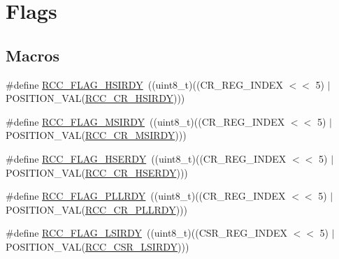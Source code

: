 \hypertarget{group___r_c_c___flag}{\section{Flags}
\label{group___r_c_c___flag}
}
\subsection*{Macros}
\begin{DoxyCompactItemize}
\item 
\#define \hyperlink{group___r_c_c___flag_ga827d986723e7ce652fa733bb8184d216}{R\-C\-C\-\_\-\-F\-L\-A\-G\-\_\-\-H\-S\-I\-R\-D\-Y}~((uint8\-\_\-t)((C\-R\-\_\-\-R\-E\-G\-\_\-\-I\-N\-D\-E\-X $<$$<$ 5) $\vert$ P\-O\-S\-I\-T\-I\-O\-N\-\_\-\-V\-A\-L(\hyperlink{group___peripheral___registers___bits___definition_ga9dbac3f2bc04f04ebafe1e66ae3fcf0d}{R\-C\-C\-\_\-\-C\-R\-\_\-\-H\-S\-I\-R\-D\-Y})))
\item 
\#define \hyperlink{group___r_c_c___flag_ga62ed7a3bb53fc28801071a2ad0d4f1af}{R\-C\-C\-\_\-\-F\-L\-A\-G\-\_\-\-M\-S\-I\-R\-D\-Y}~((uint8\-\_\-t)((C\-R\-\_\-\-R\-E\-G\-\_\-\-I\-N\-D\-E\-X $<$$<$ 5) $\vert$ P\-O\-S\-I\-T\-I\-O\-N\-\_\-\-V\-A\-L(\hyperlink{group___peripheral___registers___bits___definition_gac38ef564d136d79b5e22b564db8d2b07}{R\-C\-C\-\_\-\-C\-R\-\_\-\-M\-S\-I\-R\-D\-Y})))
\item 
\#define \hyperlink{group___r_c_c___flag_ga173edf47bec93cf269a0e8d0fec9997c}{R\-C\-C\-\_\-\-F\-L\-A\-G\-\_\-\-H\-S\-E\-R\-D\-Y}~((uint8\-\_\-t)((C\-R\-\_\-\-R\-E\-G\-\_\-\-I\-N\-D\-E\-X $<$$<$ 5) $\vert$ P\-O\-S\-I\-T\-I\-O\-N\-\_\-\-V\-A\-L(\hyperlink{group___peripheral___registers___bits___definition_ga86a34e00182c83409d89ff566cb02cc4}{R\-C\-C\-\_\-\-C\-R\-\_\-\-H\-S\-E\-R\-D\-Y})))
\item 
\#define \hyperlink{group___r_c_c___flag_gaf82d8afb18d9df75db1d6c08b9c50046}{R\-C\-C\-\_\-\-F\-L\-A\-G\-\_\-\-P\-L\-L\-R\-D\-Y}~((uint8\-\_\-t)((C\-R\-\_\-\-R\-E\-G\-\_\-\-I\-N\-D\-E\-X $<$$<$ 5) $\vert$ P\-O\-S\-I\-T\-I\-O\-N\-\_\-\-V\-A\-L(\hyperlink{group___peripheral___registers___bits___definition_gafa12d7ac6a7f0f91d066aeb2c6071888}{R\-C\-C\-\_\-\-C\-R\-\_\-\-P\-L\-L\-R\-D\-Y})))
\item 
\#define \hyperlink{group___r_c_c___flag_ga8c5e4992314d347597621bfe7ab10d72}{R\-C\-C\-\_\-\-F\-L\-A\-G\-\_\-\-L\-S\-I\-R\-D\-Y}~((uint8\-\_\-t)((C\-S\-R\-\_\-\-R\-E\-G\-\_\-\-I\-N\-D\-E\-X $<$$<$ 5) $\vert$ P\-O\-S\-I\-T\-I\-O\-N\-\_\-\-V\-A\-L(\hyperlink{group___peripheral___registers___bits___definition_gab569110e757aee573ebf9ad80812e8bb}{R\-C\-C\-\_\-\-C\-S\-R\-\_\-\-L\-S\-I\-R\-D\-Y})))
$$
\end{DoxyCompactItemize}
